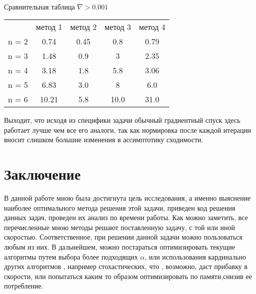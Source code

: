 \documentclass[ 12pt,x11names]{article}
\begin{document}
 \\
Сравнительная  таблица
$\nabla > 0.001 $
\begin{center}
\begin{tabular}{ c c c c c}
       & метод 1 & метод 2 & метод 3 & метод 4 \\
 n = 2 & 0.74    & 0.45     & 0.8 & 0.79 \\
 n = 3 & 1.48    & 0.9      & 3 & 2.35 \\
 n = 4 & 3.18    & 1.8      & 5.8 & 3.06 \\
 n = 5 & 6.83    & 3.0      & 8 & 6.0 \\
 n = 6 & 10.21   & 5.8      & 10.0 & 31.0 \\
\end{tabular}
\end{center}
Выходит, что исходя из специфики задачи обычный градиентный спуск здесь работает лучше чем все его аналоги, так как нормировка после каждой итерации вносит слишком большие изменения в ассимптотику сходимости.
 \newpage
    \section{Заключение}
    В данной работе мною была достигнута цель исследования, а именно выяснение наиболее оптимального метода решения этой задачи, приведен  код решения данных задач, проведен их анализ по времени работы.
    Как можно заметить, все перечисленные мною методы решают поставленную задачу, с той или иной скоростью. Соответственное, при решении данной задачи можно пользоваться любым из них.
    В дальнейшем, можно постараться оптимизировать текущие алгоритмы  путем выбора более подходящих $\alpha$, или использования кардинально других алгоритмов , например стохастических, что , возможно, даст прибавку в скорости, или попытаться каким то образом оптимизировать по памяти,снизив ее потребление.
\newpage
\end{document}
